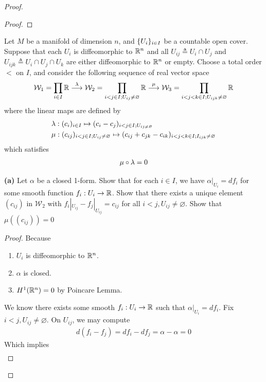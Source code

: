 \documentclass{report}
\begin{document}
\begin{proof}
\begin{proof}
\end{proof}
\begin{question}{}{}
Let $M$ be a manifold of dimension  $n$, and  $\{ U_i \}_{i \in I}$ be a countable open cover. Suppose that each $U_i$  is diffeomorphic to  $\mathbb{R}^n$ and all $U_{ij}\triangleq U_i \cap U_j$  and $U_{ijk}\triangleq U_i \cap U_j \cap U_k$ are either diffeomorphic to $\mathbb{R}^n$ or empty. Choose a total order $<$ on  $I$, and consider the following sequence of real vector space 
 \begin{align*}
\mathcal{W}_1 = \prod_{i \in I} \mathbb{R} \overset{\lambda }{\longrightarrow} \mathcal{W}_2 = \prod_{i<j \in I;U_{ij}\neq \varnothing} \mathbb{R} \overset{\mu }{\longrightarrow} \mathcal{W}_3 = \prod_{i<j<k\in I;U_{ijk}\neq \varnothing} \mathbb{R}
\end{align*}
where the linear maps are defined by 
 \begin{align*}
&\lambda :(c_i)_{i \in I}\mapsto  (c_i-c_j)_{i<j \in I;U_{ij\neq \varnothing}}  \\
&\mu: (c_{ij})_{i<j \in I;U_{ij}\neq \varnothing} \mapsto  (c_{ij}+c_{jk}-c_{ik})_{i<j<k \in I; I_{ijk}\neq \varnothing}
\end{align*}
which satisfies 
\begin{align*}
\mu \circ \lambda = 0
\end{align*}
\end{question}
\begin{theorem}
\textbf{(a)} Let $\alpha $ be a closed 1-form. Show that for each $i \in I$, we have $\alpha |_{U_i}=df_i$ for some smooth function $f_i:U_i\rightarrow \mathbb{R}$. Show that there exists a unique element $(c_{ij})$ in $\mathcal{W}_2$ with $f_i |_{U_{ij}}-f_j |_{U_{ij}}=c_{ij}$ for all $i<j,U_{ij}\neq \varnothing$. Show that $\mu ((c_{ij}))=0$
\end{theorem}
\begin{proof}
Because 
\begin{enumerate}[label=(\roman*)]
  \item $U_i$ is diffeomorphic to  $\mathbb{R}^n$. 
  \item $\alpha $ is closed. 
  \item $H^1(\mathbb{R}^n)=0$ by Poincare Lemma.  
\end{enumerate}
We know there exists some smooth  $f_i:U_i \rightarrow \mathbb{R}$ such that  $\alpha |_{U_i}=df_i$. Fix $i<j,U_{ij}\neq \varnothing$. On $U_{ij}$, we may compute 
\begin{align*}
d(f_i-f_j)=df_i-df_j= \alpha -\alpha =0
\end{align*}
Which implies 
\begin{align*}

\end{align*}
\end{proof}
\end{proof}
\end{document}
